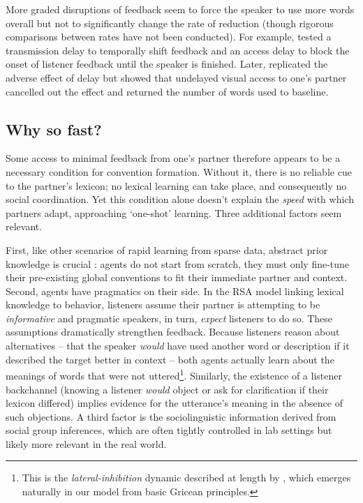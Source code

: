 More graded disruptions of feedback seem to force the speaker to use more words overall but not to significantly change the rate of reduction (though rigorous comparisons between rates have not been conducted). For example,  tested a transmission delay to temporally shift feedback and an access delay to block the onset of listener feedback until the speaker is finished. Later,  replicated the adverse effect of delay but showed that undelayed visual access to one's partner cancelled out the effect and returned the number of words used to baseline. 


\subsection{Why so fast?}

Some access to minimal feedback from one's partner therefore appears to be a necessary condition for convention formation. Without it, there is no reliable cue to the partner's lexicon; no lexical learning can take place, and consequently no social coordination. Yet this condition alone doesn't explain the \emph{speed} with which partners adapt, approaching `one-shot' learning. Three additional factors seem relevant. 

First, like other scenarios of rapid learning from sparse data, abstract prior knowledge is crucial \cite{TenenbaumKempGriffithsGoodman11_Grow_a_Mind_Science,LakeEtAl16_BuildingMachines}: agents do not start from scratch, they must only fine-tune their pre-existing global conventions to fit their immediate partner and context. Second, agents have pragmatics on their side. In the RSA model linking lexical knowledge to behavior, listeners assume their partner is attempting to be \emph{informative} and pragmatic speakers, in turn, \emph{expect} listeners to do so. These assumptions dramatically strengthen feedback. Because listeners reason about alternatives -- that the speaker \emph{would} have used another word or description if it described the target better in context -- both agents actually learn about the meanings of words that were not uttered\footnote{
This is the \emph{lateral-inhibition} dynamic described at length by , which emerges naturally in our model from basic Gricean principles.
}. Similarly, the existence of a listener backchannel (knowing a listener \emph{would} object or ask for clarification if their lexicon differed) implies evidence for the utterance's meaning in the absence of such objections. A third factor is the sociolinguistic information derived from social group inferences, which are often tightly controlled in lab settings but likely more relevant in the real world. 

